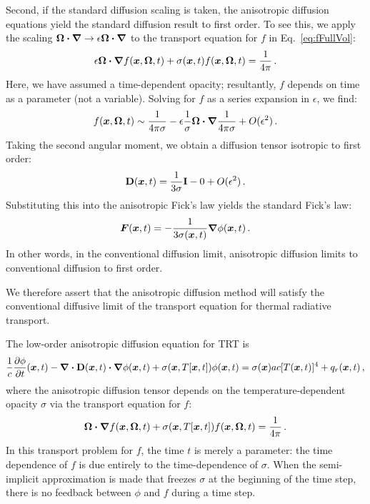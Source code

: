 Second, if the standard diffusion scaling is taken, the anisotropic diffusion
equations yield the standard diffusion result to first order. To see this, we
apply the scaling $\bm{\Omega}\bm{\cdot} \bm{\nabla} \to \epsilon \bm{\Omega}\bm{\cdot} \bm{\nabla}$ to
the transport equation for $f$ in Eq.~\eqref{eq:fFullVol}:
\begin{equation*}
  \epsilon \bm{\Omega}\bm{\cdot} \bm{\nabla} f(\bm{x}, \bm{\Omega}, t)
  + \sigma(\bm{x},t) f(\bm{x}, \bm{\Omega}, t)
  = \frac{1}{4\pi}\,.
\end{equation*}
Here, we have assumed a time-dependent opacity; resultantly, $f$ depends on
time as a parameter (not a variable). Solving for $f$ as a series expansion in
$\epsilon$, we find:
\begin{align*}
  f(\bm{x}, \bm{\Omega}, t)
  \sim
  \frac{1}{4\pi \sigma}
  - \epsilon 
  \frac{1}{\sigma} \bm{\Omega}\bm{\cdot} \bm{\nabla} \frac{1}{4\pi \sigma}
  + O( \epsilon^2)\,.
\end{align*}
Taking the second angular moment, we obtain a diffusion tensor isotropic to
first order:
\begin{equation*}
  \mathbf{D}(\bm{x}, t)
  =
  \frac{1}{3 \sigma} \mathbf{I}
  - 0
  + O( \epsilon^2)\,.
\end{equation*}
Substituting this into the anisotropic Fick's law yields the standard Fick's
law:
\begin{equation*}
  \bm{F}(\bm{x},t) = - \frac{1}{3 \sigma(\bm{x},t)} \bm{\nabla} \phi(\bm{x},t)\,.
\end{equation*}
In other words, in the conventional diffusion limit, anisotropic diffusion
limits to conventional diffusion to first order.

We therefore assert that the anisotropic diffusion method will
satisfy the conventional diffusive limit of the transport equation for thermal
radiative transport.

The low-order anisotropic diffusion equation for TRT is
\begin{equation*}
\frac{1}{c} \frac{\partial \phi}{\partial t} (\bm{x}, t)
  - \bm{\nabla} \bm{\cdot} \mathbf{D}(\bm{x},t) \bm{\cdot} \bm{\nabla} \phi(\bm{x},t)
  + \sigma(\bm{x}, T[\bm{x}, t]) \phi(\bm{x}, t)
  = \sigma(\bm{x}) ac [T(\bm{x}, t)]^4 + q_{r}(\bm{x}, t)\,,
\end{equation*}
where the anisotropic diffusion tensor depends on the temperature-dependent
opacity $\sigma$ via the transport equation for $f$:
\begin{equation*}
  \bm{\Omega}\bm{\cdot} \bm{\nabla} f(\bm{x}, \bm{\Omega}, t)
  + \sigma(\bm{x},T[\bm{x},t]) f(\bm{x}, \bm{\Omega}, t)
  = \frac{1}{4\pi}\,.
\end{equation*}
In this transport problem for $f$, the time $t$ is merely a parameter:
the time dependence of $f$ is due entirely to the time-dependence of $\sigma$.
When the semi-implicit approximation is made that freezes $\sigma$ at the
beginning of the time step, there is no feedback between $\phi$ and $f$ during a
time step.


